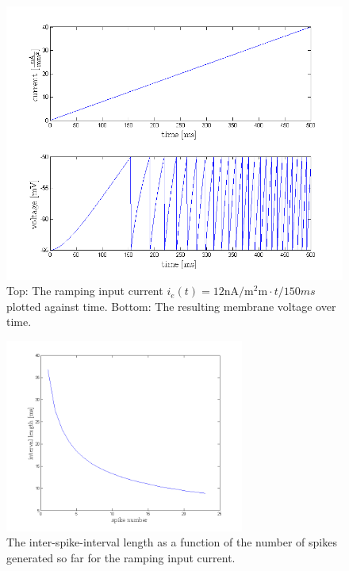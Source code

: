 \documentclass{scrartcl}
\begin{document}
\begin{figure}
\centering
\includegraphics[trim = {1.1cm 0 1.7cm 1.1cm}, width=\textwidth, clip]{../pics/ramp}
\caption{Top: The ramping input current $i_e(t) = 12 \si{\nano\ampere\per\square\milli\meter} \cdot t / 150 \si{ms}$ plotted against time. Bottom: The resulting membrane voltage over time.}
\label{ramp}
\end{figure}

\begin{figure}
\centering
\includegraphics[trim = {1.3cm 0 1.8cm 0.9cm}, width=0.7\textwidth, clip]{../pics/ramp_intervals}
\caption{The inter-spike-interval length as a function of the number of spikes generated so far for the ramping input current.}
\label{intervals}
\end{figure}

\end{document}
